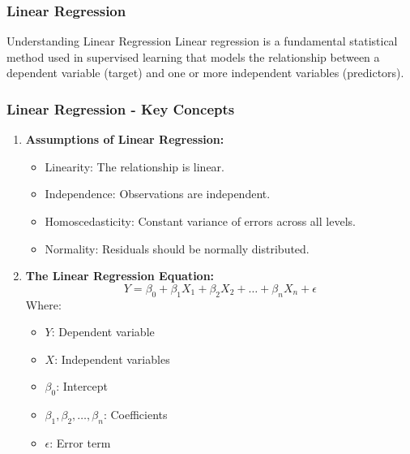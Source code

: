 \documentclass[aspectratio=169]{beamer}
\begin{document}
\begin{frame}[fragile]
    \frametitle{Linear Regression}
    \begin{block}{Understanding Linear Regression}
        Linear regression is a fundamental statistical method used in supervised learning that models the relationship between a dependent variable (target) and one or more independent variables (predictors).
    \end{block}
\end{frame}

\begin{frame}[fragile]
    \frametitle{Linear Regression - Key Concepts}
    \begin{enumerate}
        \item \textbf{Assumptions of Linear Regression:}
        \begin{itemize}
            \item Linearity: The relationship is linear.
            \item Independence: Observations are independent.
            \item Homoscedasticity: Constant variance of errors across all levels.
            \item Normality: Residuals should be normally distributed.
        \end{itemize}

        \item \textbf{The Linear Regression Equation:}
        \begin{equation}
        Y = \beta_0 + \beta_1X_1 + \beta_2X_2 + \ldots + \beta_nX_n + \epsilon
        \end{equation}
        Where:
        \begin{itemize}
            \item $Y$: Dependent variable
            \item $X$: Independent variables
            \item $\beta_0$: Intercept
            \item $\beta_1, \beta_2, \ldots, \beta_n$: Coefficients
            \item $\epsilon$: Error term
        \end{itemize}
    \end{enumerate}
\end{frame}
\end{document}
